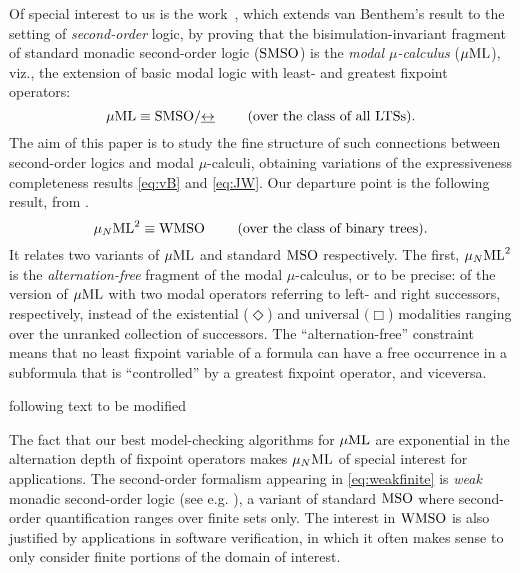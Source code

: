 Of special interest to us is the work~\cite{Jan96}, which extends van Benthem's
result to the setting of \emph{second-order} logic, by proving that the 
bisimulation-invariant fragment of standard monadic second-order logic 
($\mathrm{SMSO}$) is the \emph{modal $\mu$-calculus} ($\mu\mathrm{ML}$), viz., the extension of
basic modal logic with least- and greatest fixpoint operators:
\begin{equation}
\label{eq:JW}
\muML \equiv \smso/{\bis}  \qquad  \text{ (over the class of all LTSs)}.
\end{equation}
The aim of this paper is to study the fine structure of such connections between
second-order logics and modal $\mu$-calculi, obtaining variations of the
expressiveness completeness results \eqref{eq:vB} and \eqref{eq:JW}.
Our departure point is the following result, from \cite{ArnNiw92}.
\begin{equation}
\label{eq:weakbinary}
\AFMC^{2} \equiv \wmso  \qquad  \text{ (over the class of binary trees)}.
\end{equation}
It relates two variants of $\mu\mathrm{ML}$ and standard $\mathrm{MSO}$ respectively. 
The first, $\mu_{N}\mathrm{ML}^{2}$ is the \emph{alternation-free} fragment of the modal 
$\mu$-calculus, or to be precise: of the version of $\mu\mathrm{ML}$ with two modal 
operators referring to left- and right successors, respectively, instead of 
the existential ($\Diamond$) and universal $(\Box$) modalities ranging over the 
unranked collection of successors.
The ``alternation-free'' constraint means that no least fixpoint variable of a 
formula can have a free occurrence in a subformula that is  ``controlled'' by a
greatest fixpoint operator, and viceversa. 

\btbs
\item
following text to be modified 
\etbs

The fact that our best model-checking algorithms for $\mu\mathrm{ML}$ are exponential in
the alternation depth of fixpoint operators 
\cite{EmersonL86,DBLP:conf/cav/LongBCJM94} makes $\mu_{N}\mathrm{ML}$ of special interest for
applications. 
The second-order formalism appearing in \eqref{eq:weakfinite} is \emph{weak}
monadic second-order logic (see e.g. \cite[Ch. 3]{ALG02}), a variant of standard
$\mathrm{MSO}$ where second-order quantification ranges over finite sets only. 
The interest in $\mathrm{WMSO}$ is also justified by applications in software 
verification, in which it often makes sense to only consider finite portions of 
the domain of interest. 
\medskip

